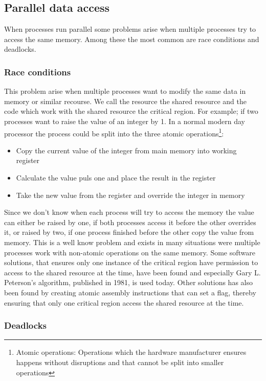 \subsection{Parallel data access}
When processes run parallel some problems arise when multiple processes try to access the same memory. Among these the most common are race conditions and deadlocks.

\subsubsection{Race conditions}
This problem arise when multiple processes want to modify the same data in memory or similar recourse. We call the resource the shared resource and the code which work with the shared resource the critical region. For example; if two processes want to raise the value of an integer by 1. In a normal modern day processor the process could be split into the three atomic operations\footnote{Atomic operations: Operations which the hardware manufacturer ensures happens without disruptions and that cannot be split into smaller operations}:

\begin{itemize}
\item Copy the current value of the integer from main memory into working register
\item Calculate the value puls one and place the result in the register
\item Take the new value from the register and override the integer in memory
\end{itemize}
Since we don't know when each process will try to access the memory the value can either be raised by one, if both processes access it before the other overrides it, or raised by two, if one process finished before the other copy the value from memory. This is a well know problem and exists in many situations were multiple processes work with non-atomic operations on the same memory. Some software solutions, that ensures only one instance of the critical region have permission to access to the shared resource at the time, have been found and especially Gary L. Peterson's algorithm, published in 1981, is used today. Other solutions has also been found by creating atomic assembly instructions that can set a flag, thereby ensuring that only one critical region access the shared resource at the time.

\subsubsection{Deadlocks}
